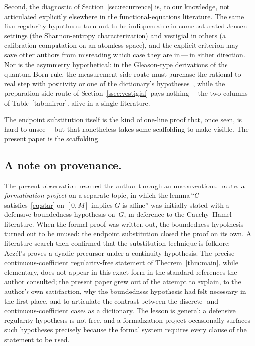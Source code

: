 \documentclass{article}
\theoremstyle{plain}
\theoremstyle{definition}
\begin{document}
Second, the diagnostic of Section~\ref{sec:recurrence} is, to our
knowledge, not articulated explicitly elsewhere in the
functional-equations literature. The same five regularity hypotheses
turn out to be indispensable in some saturated-Jensen settings (the
Shannon-entropy characterization) and vestigial in others (a
calibration computation on an atomless space), and the explicit
criterion may save other authors from misreading which case they are
in\,---\,in either direction. Nor is the asymmetry hypothetical: in
the Gleason-type derivations of the quantum Born rule, the
measurement-side route must purchase the rational-to-real step with
positivity or one of the dictionary's
hypotheses~\cite{Gleason1957,Busch2003,CFMR2004,WrightWeigert2019},
while the preparation-side route of Section~\ref{ssec:vestigial} pays
nothing\,---\,the two columns of Table~\ref{tab:mirror}, alive in a
single literature.

The endpoint substitution itself is the kind of one-line proof that, once
seen, is hard to unsee\,---\,but that nonetheless takes some scaffolding to
make visible. The present paper is the scaffolding.

\subsection*{A note on provenance.}

The present observation reached the author through an unconventional
route: a \emph{formalization project} on a separate topic, in which the
lemma\,``$G$ satisfies~\eqref{eq:star} on $[0,M]$ implies $G$ is
affine'' was initially stated with a defensive boundedness hypothesis
on~$G$, in deference to the Cauchy--Hamel literature. When the formal
proof was written out, the boundedness hypothesis turned out to be
unused: the endpoint substitution closed the proof on its own.
A literature search then confirmed that the substitution technique is
folklore: Acz\'el's \cite[\S2.1.4]{Aczel1966} proves a dyadic precursor
under a continuity hypothesis. The precise continuous-coefficient
regularity-free statement of Theorem~\ref{thm:main}, while elementary,
does not appear in this exact form in the standard references the
author consulted; the present paper grew out of the attempt to explain,
to the author's own satisfaction, why the boundedness hypothesis had
felt necessary in the first place, and to articulate the contrast
between the discrete- and continuous-coefficient cases as a dictionary.
The lesson is
general: a defensive regularity hypothesis is not free, and a
formalization project occasionally surfaces such hypotheses precisely
because the formal system requires every clause of the statement to be
used.
\end{document}
